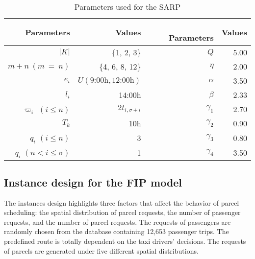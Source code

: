 \documentclass[preprint,authoryear,12pt]{elsarticle}
\begin{document}
\begin{table} [!htbp]
\caption{Parameters used for the SARP}
\vspace{-1em}
\center
\small
\begin{tabular}{r r r r}
\hline
Parameters & Values & ~~~~~~~~ Parameters & Values\\
\hline
$|K|$& \{1, 2, 3\} & $Q$ & 5.00\\
$m+n~(m~=~n)$ &\{4, 6, 8, 12\} & $\eta$ & 2.00\\
$e_i$& $U(\mbox{9:00h},\mbox{12:00h})$ & $\alpha$ & 3.50\\
$l_i$& 14:00h&$\beta$ & 2.33\\
$\varpi_i$ $(i\leq n)$ & $2t_{i,\sigma+i}$ & $\gamma_1$ & 2.70\\
$T_k$& 10h & $\gamma_2$ & 0.90\\
$q_i$ $(i\leq n)$ & 3 & $\gamma_3$ & 0.80 \\
$q_i$ $(n<i\leq\sigma)$ & 1 &$\gamma_4$&3.50\\
\hline
\end{tabular}
\label{SARPpara}
\end{table}

\subsection{Instance design for the FIP model}
\label{sec_FIP_settings}
The instances design highlights three factors that affect the behavior of parcel scheduling: the spatial distribution of parcel requests, the number of passenger requests, and the number of parcel requests. The requests of passengers are randomly chosen from the database containing 12,653 passenger trips. The predefined route is totally dependent on the taxi drivers' decisions. The requests of parcels are generated under five different spatial distributions.
\end{document}
